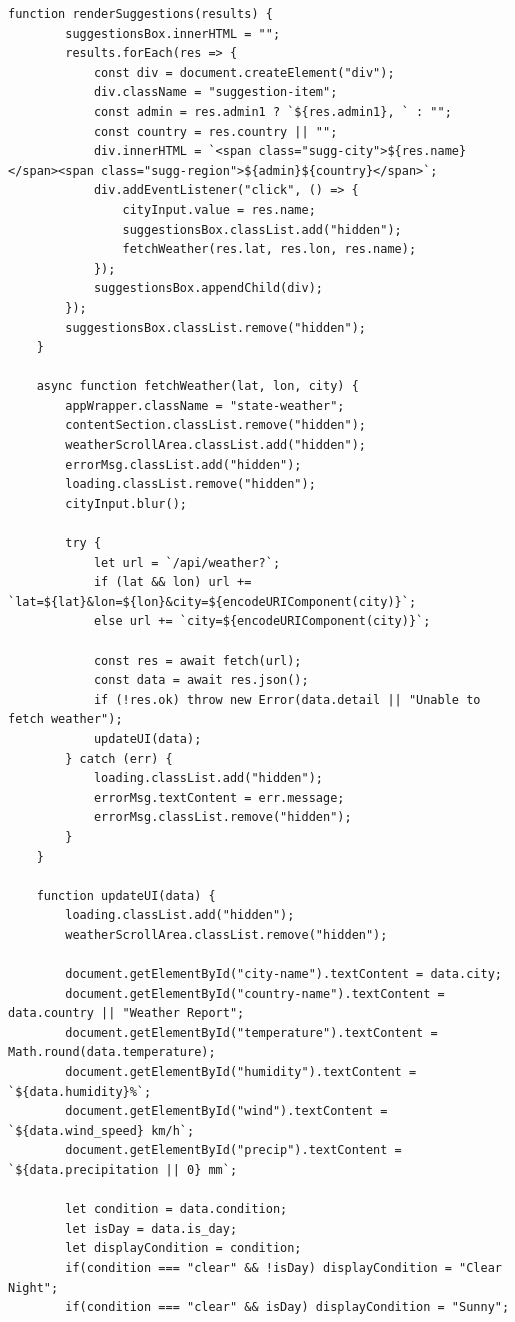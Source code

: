 \documentclass[12pt,a4paper]{article}
\begin{document}
\begin{lstlisting}[caption=Frontend Logic (static/app.js)]
    function renderSuggestions(results) {
        suggestionsBox.innerHTML = "";
        results.forEach(res => {
            const div = document.createElement("div");
            div.className = "suggestion-item";
            const admin = res.admin1 ? `${res.admin1}, ` : "";
            const country = res.country || "";
            div.innerHTML = `<span class="sugg-city">${res.name}</span><span class="sugg-region">${admin}${country}</span>`;
            div.addEventListener("click", () => {
                cityInput.value = res.name;
                suggestionsBox.classList.add("hidden");
                fetchWeather(res.lat, res.lon, res.name);
            });
            suggestionsBox.appendChild(div);
        });
        suggestionsBox.classList.remove("hidden");
    }

    async function fetchWeather(lat, lon, city) {
        appWrapper.className = "state-weather";
        contentSection.classList.remove("hidden");
        weatherScrollArea.classList.add("hidden");
        errorMsg.classList.add("hidden");
        loading.classList.remove("hidden");
        cityInput.blur();

        try {
            let url = `/api/weather?`;
            if (lat && lon) url += `lat=${lat}&lon=${lon}&city=${encodeURIComponent(city)}`;
            else url += `city=${encodeURIComponent(city)}`;
            
            const res = await fetch(url);
            const data = await res.json();
            if (!res.ok) throw new Error(data.detail || "Unable to fetch weather");
            updateUI(data);
        } catch (err) {
            loading.classList.add("hidden");
            errorMsg.textContent = err.message;
            errorMsg.classList.remove("hidden");
        }
    }

    function updateUI(data) {
        loading.classList.add("hidden");
        weatherScrollArea.classList.remove("hidden");

        document.getElementById("city-name").textContent = data.city;
        document.getElementById("country-name").textContent = data.country || "Weather Report";
        document.getElementById("temperature").textContent = Math.round(data.temperature);
        document.getElementById("humidity").textContent = `${data.humidity}%`;
        document.getElementById("wind").textContent = `${data.wind_speed} km/h`;
        document.getElementById("precip").textContent = `${data.precipitation || 0} mm`;

        let condition = data.condition;
        let isDay = data.is_day;
        let displayCondition = condition;
        if(condition === "clear" && !isDay) displayCondition = "Clear Night";
        if(condition === "clear" && isDay) displayCondition = "Sunny";
        

\end{lstlisting}
\end{document}
